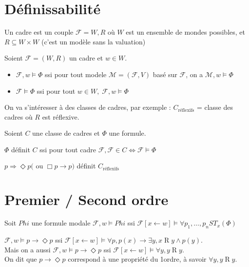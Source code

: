 \documentclass[10pt,a4paper]{article}
\newcommand{\F}{\mathcal{F}}
\newcommand{\M}{\mathcal{M}}
\DeclareMathOperator{\Ro}{R}
\begin{document}
\section{Définissabilité}

\begin{definition}[cadre]
 Un cadre est un couple $\F = W, R$ où $W$ est un ensemble de mondes possibles, et $R \subseteq W \times W$
(c'est un modèle sans la valuation)
\end{definition}

\begin{definition}
 Soient $\F = (W,R)$ un cadre et $w \in W$.
\begin{itemize}
 \item $\F, w \models \Phi$ ssi pour tout modele $\M = (\F, V)$ basé sur $\F$, on a $\M,w \models \Phi$
 \item $\F \models \Phi$ ssi pour tout $w \in W, \; \F, w \models \Phi$
\end{itemize}
\end{definition}
On va s'intéresser à des classes de cadres,  par exemple : 
$C_{\text{réflexifs}}$ = classe des cadres où $R$ est réflexive.

\begin{definition}
 Soient $C$ une classe de cadres et $\Phi$ une formule.

$\Phi$ définit $C$ ssi pour tout cadre $\F,\F \in C \Leftrightarrow \F \models \Phi$
\end{definition}

\begin{ex}
 $p \Rightarrow \Diamond p ($ ou $\Box p \rightarrow p)$ définit $C_{\text{réflexifs}}  $
\end{ex}


\section{Premier / Second ordre}

\begin{prop}
 Soit $Phi$ une formule modale
$\F,w \models Phi$ ssi $\F[x \leftarrow w] \models \forall p_1, \dots, p_n ST_x (\Phi)$
\end{prop}

\begin{ex}
 $\F,w \models p \rightarrow \Diamond p$ ssi $\F[x \leftarrow w] \models \forall p, p(x)  \rightarrow \exists y, x   \Ro y \wedge p(y)$.\\
Mais on a aussi $\F,w \models p  \rightarrow \Diamond p$ ssi $\F[x \leftarrow w] \models \forall y , y   \Ro y$.\\
On dit que $p \rightarrow \Diamond p$ correspond à une propriété du 1\ier ordre, à savoir $\forall y , y   \Ro y$.
\end{ex}
\end{document}
